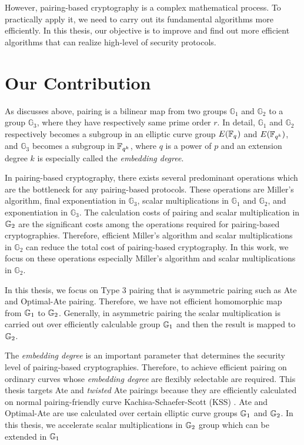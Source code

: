However, pairing-based cryptography is a complex mathematical process.
To practically apply it, we need to carry out its fundamental algorithms more efficiently.
In this thesis, our objective is to improve and find out more efficient algorithms that can realize high-level of security protocols.

\section{Our Contribution}
\label{ch1_sec_contribution}
As discusses above, pairing is a bilinear map from two groups $\mathbb{G}_1$ and $\mathbb{G}_2$ to a group $\mathbb{G}_3$, where they have respectively same prime order $r$.
In detail, $\mathbb{G}_1$ and $\mathbb{G}_2$ respectively becomes a subgroup in an elliptic curve group $E({\mathbb{F}}_{q^{}})$ and $E({\mathbb{F}}_{q^{k}})$, and $\mathbb{G}_3$ becomes a subgroup in ${\mathbb{F}}_{q^{k}}$, where $q$ is a power of $p$ and an extension degree $k$ is especially called the {\it embedding degree}.

In pairing-based cryptography, there exists several predominant operations which are the bottleneck for any pairing-based protocols.
These operations are Miller's algorithm, final exponentiation in $\mathbb{G}_3$, scalar multiplications in $\mathbb{G}_1$ and $\mathbb{G}_2$, and exponentiation in $\mathbb{G}_3$.
The calculation costs of pairing and scalar multiplication in ${\mathbb{G}}_{2}$ are the significant costs among the operations required for pairing-based cryptographies.
Therefore, efficient Miller's algorithm and scalar multiplications in $\mathbb{G}_2$ can reduce the total cost of pairing-based cryptography.
In this work, we focus on these operations especially Miller's algorithm and scalar multiplications in $\mathbb{G}_2$.
	
In this thesis, we focus on Type 3 pairing that is asymmetric pairing such as Ate \cite{EPRINT:MKHO07} and Optimal-Ate \cite{DBLP:journals/tit/Vercauteren10} pairing.
Therefore, we have not efficient homomorphic map from ${\mathbb{G}}_{1}$ to ${\mathbb{G}}_{2}$. 
Generally, in asymmetric pairing the scalar multiplication is carried out over efficiently calculable group ${\mathbb{G}}_{1}$ and then the result is mapped to ${\mathbb{G}}_{2}$.

The {\it embedding degree} is an important parameter that determines the security level of pairing-based cryptographies.
Therefore, to achieve efficient pairing on ordinary curves whose {\it embedding degree} are flexibly selectable are required.
This thesis targets Ate and {\it twisted} Ate pairings because they are efficiently calculated on normal pairing-friendly curve Kachisa-Schaefer-Scott (KSS) \cite{EPRINT:KacSchSco07}.
Ate and Optimal-Ate are use calculated over certain elliptic curve groups ${\mathbb{G}}_{1}$ and ${\mathbb{G}}_{2}$.
In this thesis, we accelerate scalar multiplications in ${\mathbb{G}}_{2}$ group which can be extended in ${\mathbb{G}}_{1}$

